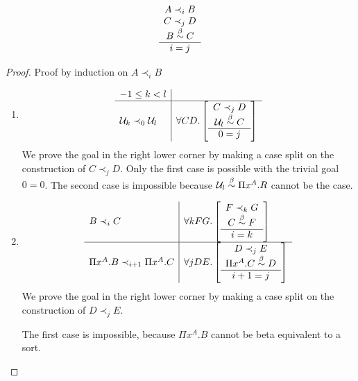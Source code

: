 \begin{lemma}
    \label{PrecedenceSameArity}
    $$
    \begin{array}{c} 
        A \prec_i B
        \\
        C \prec_j D
        \\
        B \stackrel{\beta}{\sim} C
     \\ \hline 
        i = j
    \end{array}
    $$

    \begin{proof}
        Proof by induction on $A \prec_i B$
        \begin{enumerate}
        \item
            $$
            \begin{array}{l|l}
                -1 \le k < l
                \\
                \hline
                {\cal U}_k \prec_0 {\cal U}_l
                &
                \forall C D.
                \left[
                \begin{array}{c} 
                    C \prec_j D
                    \\
                    {\cal U}_l \stackrel{\beta}{\sim} C
                 \\ \hline 0 = j\end{array}
                \right]
            \end{array}
            $$
            We prove the goal in the right lower corner by making a case split
            on the construction of $C \prec_j D$. Only the first case
            is possible with the trivial goal $0 = 0$. The second case is
            impossible because ${\cal U}_l \stackrel{\beta}{\sim} \Pi x^A. R$ cannot be the case.

        \item
        $$
            \begin{array}{l|l}
                B \prec_i C
                &
                \forall k F G.
                \left[
                \begin{array}{c} F \prec_k G \\ C \stackrel{\beta}{\sim} F \\ \hline i = k\end{array}
                \right]
                \\
                \hline
                \Pi x^A.B \prec_{i+1} \Pi x^A. C
                &
                \forall j D E.
                \left[
                \begin{array}{c} 
                    D \prec_j E
                    \\
                    \Pi x^A. C \stackrel{\beta}{\sim} D
                 \\ \hline i+1 = j\end{array}
                \right]
            \end{array}
        $$
        We prove the goal in the right lower corner by making a case split on
        the construction of $D \prec_j E$.

        The first case is impossible, because $\Pi x^A. B$ cannot be beta
        equivalent to a sort.


\end{enumerate}
\end{proof}
\end{lemma}
